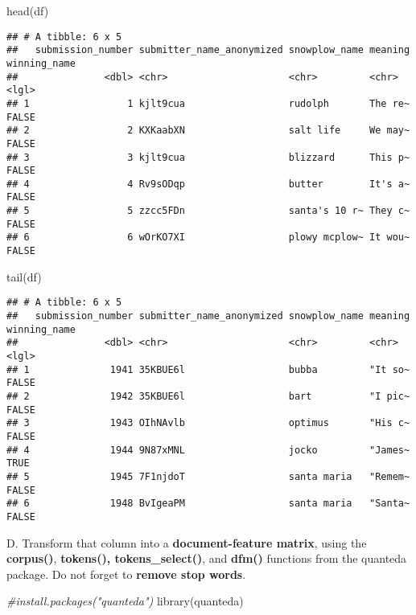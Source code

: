 \documentclass[
]{article}
\newenvironment{Shaded}{\begin{snugshade}}{\end{snugshade}}
\newcommand{\CommentTok}[1]{\textcolor[rgb]{0.56,0.35,0.01}{\textit{#1}}}
\newcommand{\FunctionTok}[1]{\textcolor[rgb]{0.00,0.00,0.00}{#1}}
\newcommand{\NormalTok}[1]{#1}
\begin{document}
\begin{Shaded}
\begin{Highlighting}[]
\FunctionTok{head}\NormalTok{(df)}
\end{Highlighting}
\end{Shaded}

\begin{verbatim}
## # A tibble: 6 x 5
##   submission_number submitter_name_anonymized snowplow_name meaning winning_name
##               <dbl> <chr>                     <chr>         <chr>   <lgl>       
## 1                 1 kjlt9cua                  rudolph       The re~ FALSE       
## 2                 2 KXKaabXN                  salt life     We may~ FALSE       
## 3                 3 kjlt9cua                  blizzard      This p~ FALSE       
## 4                 4 Rv9sODqp                  butter        It's a~ FALSE       
## 5                 5 zzcc5FDn                  santa's 10 r~ They c~ FALSE       
## 6                 6 wOrKO7XI                  plowy mcplow~ It wou~ FALSE
\end{verbatim}

\begin{Shaded}
\begin{Highlighting}[]
\FunctionTok{tail}\NormalTok{(df)}
\end{Highlighting}
\end{Shaded}

\begin{verbatim}
## # A tibble: 6 x 5
##   submission_number submitter_name_anonymized snowplow_name meaning winning_name
##               <dbl> <chr>                     <chr>         <chr>   <lgl>       
## 1              1941 35KBUE6l                  bubba         "It so~ FALSE       
## 2              1942 35KBUE6l                  bart          "I pic~ FALSE       
## 3              1943 OIhNAvlb                  optimus       "His c~ FALSE       
## 4              1944 9N87xMNL                  jocko         "James~ TRUE        
## 5              1945 7F1njdoT                  santa maria   "Remem~ FALSE       
## 6              1948 BvIgeaPM                  santa maria   "Santa~ FALSE
\end{verbatim}

D. Transform that column into a \textbf{document-feature matrix}, using
the \textbf{corpus()}, \textbf{tokens(), tokens\_select()}, and
\textbf{dfm()} functions from the quanteda package. Do not forget to
\textbf{remove stop words}.

\begin{Shaded}
\begin{Highlighting}[]
\CommentTok{\#install.packages("quanteda")}
\FunctionTok{library}\NormalTok{(quanteda)}
\end{Highlighting}
\end{Shaded}
\end{document}
